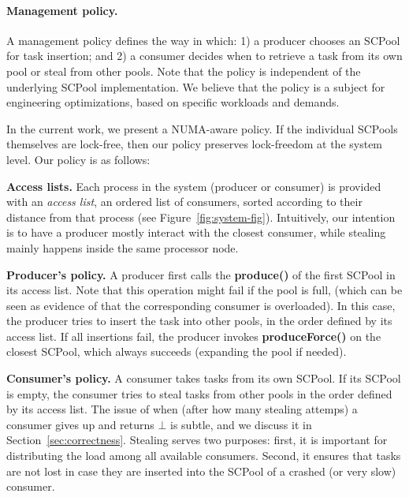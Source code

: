 \negspace
\paragraph {Management policy.}
A management policy defines the way in which: 1) a producer chooses an SCPool for task insertion; and 2) a consumer decides when to retrieve a task from its own pool or steal from other pools. 
Note that the policy is independent of the underlying SCPool implementation. We believe that the policy is a subject for engineering optimizations, based on specific workloads and demands.

In the current work, we present a NUMA-aware policy. If the individual SCPools themselves are lock-free, then our policy preserves lock-freedom at the system level. Our policy is as follows:
\snegspace
\begin{item*}
	\item {\bf Access lists.} Each process in the system (producer or consumer) is provided with an \emph{access list}, an ordered list of consumers, sorted according to their distance from that process (see Figure~\ref{fig:system-fig}). Intuitively, our intention is to have a producer mostly interact with the closest consumer, while stealing mainly happens inside the same processor node. 
	\item {\bf Producer's policy.} A producer first calls the {\bf produce()} of the first SCPool in its access list. Note that this operation might fail if the pool is full, (which can be seen as evidence of that the corresponding consumer is overloaded).  In this case, the producer tries to insert the task into other pools, in the order defined by its access list. If all insertions fail, the producer invokes {\bf produceForce()} on the closest SCPool, which always succeeds (expanding the pool if needed). 
	\item {\bf Consumer's policy.} A consumer takes tasks from its own SCPool. If its SCPool is empty, the consumer tries to steal tasks from other pools in the order defined by its access list. The issue of when (after how many stealing attemps) a consumer gives up and returns $\bot$ is subtle, and we discuss it in Section~\ref{sec:correctness}. Stealing serves two purposes: first, it is important for distributing the load among all available consumers. Second, it ensures that tasks are not lost in case they are inserted into  the SCPool of a crashed (or  very slow) consumer.
\end{item*}
